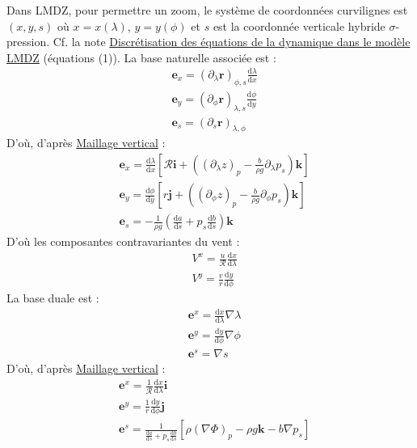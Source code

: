 \documentclass[a4paper,english,french]{article}
\newcommand{\ud}{\mathrm{d}}
\begin{document}
Dans LMDZ, pour permettre un zoom, le système de coordonnées
curvilignes est $(x, y, s)$ où $x = x(\lambda)$, $y = y(\phi)$ et $s$
est la coordonnée verticale hybride $\sigma$-pression. Cf. la
note
\href{../../../Documentation_LMDZ/Dynamics_texfol/dynamics.pdf}{Discrétisation
  des équations de la dynamique dans le modèle LMDZ} (équations
(1)). La base naturelle associée est :
\begin{align*}
  & \mathbf{e}_x
    = (\partial_\lambda \mathbf{r})_{\phi, s} \frac{\ud \lambda}{\ud x} \\
  & \mathbf{e}_y
    = (\partial_\phi \mathbf{r})_{\lambda, s} \frac{\ud \phi}{\ud y} \\
  & \mathbf{e}_s = (\partial_s \mathbf{r})_{\lambda, \phi} 
\end{align*}
D'où,
d'après \href{../Vertical_grid_texfol/vertical_grid.pdf}{Maillage
  vertical} :
\begin{align*}
  & \mathbf{e}_x
    = \frac{\ud \lambda}{\ud x}
    \left[
    \mathscr{R} \mathbf{i}
    +
    \left(
    (\partial_\lambda z)_p - \frac{b}{\rho g} \partial_\lambda p_s
    \right)
    \mathbf{k}
    \right] \\
  & \mathbf{e}_y
    =  \frac{\ud \phi}{\ud y}
    \left[
    r \mathbf{j}
    +
    \left(
    (\partial_\phi z)_p - \frac{b}{\rho g} \partial_\phi p_s
    \right)
    \mathbf{k}
    \right] \\
  & \mathbf{e}_s
    = - \frac{1}{\rho g}
    \left(\frac{\ud a}{\ud s} + p_s \frac{\ud b}{\ud s} \right) \mathbf{k}
\end{align*}
D'où les composantes contravariantes du vent :
\begin{align*}
  & V^x = \frac{u}{\mathscr{R}} \frac{\ud x}{\ud \lambda} \\
  & V^y = \frac{v}{r} \frac{\ud y}{\ud \phi}
\end{align*}
La base duale est :
\begin{align*}
  & \mathbf{e}^x = \frac{\ud x}{\ud \lambda} \nabla \lambda \\
  & \mathbf{e}^y = \frac{\ud y}{\ud \phi} \nabla \phi \\
  & \mathbf{e}^s = \nabla s
\end{align*}
D'où,
d'après \href{../Vertical_grid_texfol/vertical_grid.pdf}{Maillage
  vertical} :
\begin{align*}
  & \mathbf{e}^x = \frac{1}{\mathscr{R}} \frac{\ud x}{\ud \lambda} \mathbf{i} \\
  & \mathbf{e}^y = \frac{1}{r} \frac{\ud y}{\ud \phi} \mathbf{j} \\
  & \mathbf{e}^s
    = \frac{1}{\frac{\ud a}{\ud s} + p_s \frac{\ud b}{\ud s}}
  [\rho (\nabla \Phi)_p - \rho g \mathbf{k} - b \nabla p_s]
\end{align*}
\end{document}
